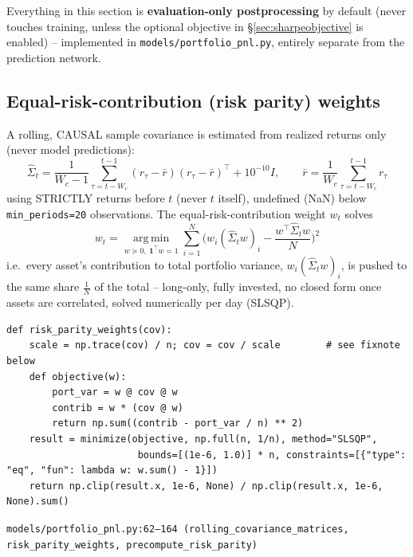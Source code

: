 \documentclass[11pt]{article}
\newcommand{\srcref}[1]{\hfill\textcolor{cmtcolor}{\footnotesize\texttt{#1}}}
\newcommand{\code}[1]{\texttt{\small #1}}
\begin{document}
Everything in this section is \textbf{evaluation-only postprocessing} by default (never
touches training, unless the optional objective in \S\ref{sec:sharpeobjective} is enabled) --
implemented in \texttt{models/portfolio\_pnl.py}, entirely separate from the prediction
network.

\subsection{Equal-risk-contribution (risk parity) weights}
\label{sec:riskparity}

A rolling, CAUSAL sample covariance is estimated from realized returns only (never model
predictions):
\begin{equation}
  \hat\Sigma_t = \frac{1}{W_c - 1}\sum_{\tau=t-W_c}^{t-1} (r_\tau - \bar r)(r_\tau - \bar r)^\top + 10^{-10} I, \qquad
  \bar r = \frac{1}{W_c}\sum_{\tau=t-W_c}^{t-1} r_\tau
  \label{eq:rollingcov}
\end{equation}
using STRICTLY returns before $t$ (never $t$ itself), undefined (NaN) below \code{min\_periods=20}
observations. The equal-risk-contribution weight $w_t$ solves
\begin{equation}
  w_t = \operatorname*{arg\,min}_{w \succeq 0,\ \mathbf{1}^\top w = 1} \sum_{i=1}^N \Big( w_i (\hat\Sigma_t w)_i - \frac{w^\top \hat\Sigma_t w}{N} \Big)^{\!2}
  \label{eq:erc}
\end{equation}
i.e.\ every asset's contribution to total portfolio variance, $w_i (\hat\Sigma_t w)_i$, is
pushed to the same share $\frac{1}{N}$ of the total -- long-only, fully invested, no closed
form once assets are correlated, solved numerically per day (SLSQP).
\begin{lstlisting}[caption={Equal-risk-contribution solve (SLSQP), rescaled for numerical conditioning.}, label=lst:erc]
def risk_parity_weights(cov):
    scale = np.trace(cov) / n; cov = cov / scale        # see fixnote below
    def objective(w):
        port_var = w @ cov @ w
        contrib = w * (cov @ w)
        return np.sum((contrib - port_var / n) ** 2)
    result = minimize(objective, np.full(n, 1/n), method="SLSQP",
                       bounds=[(1e-6, 1.0)] * n, constraints=[{"type": "eq", "fun": lambda w: w.sum() - 1}])
    return np.clip(result.x, 1e-6, None) / np.clip(result.x, 1e-6, None).sum()
\end{lstlisting}
\srcref{models/portfolio\_pnl.py:62--164 (\texttt{rolling\_covariance\_matrices},
\texttt{risk\_parity\_weights}, \texttt{precompute\_risk\_parity})}
\end{document}
